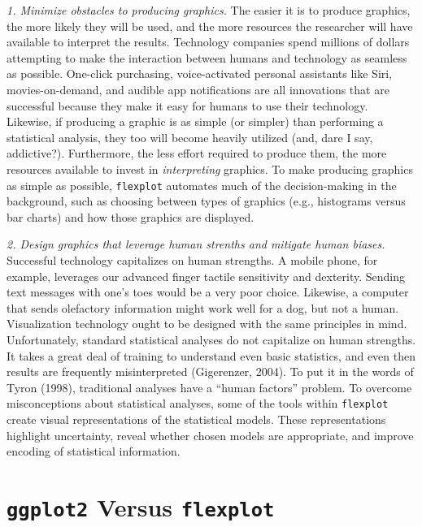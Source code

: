 \documentclass[
  english,
  man]{apa6}
\begin{document}
\emph{1. Minimize obstacles to producing graphics.} The easier it is to produce graphics, the more likely they will be used, and the more resources the researcher will have available to interpret the results. Technology companies spend millions of dollars attempting to make the interaction between humans and technology as seamless as possible. One-click purchasing, voice-activated personal assistants like Siri, movies-on-demand, and audible app notifications are all innovations that are successful because they make it easy for humans to use their technology. Likewise, if producing a graphic is as simple (or simpler) than performing a statistical analysis, they too will become heavily utilized (and, dare I say, addictive?). Furthermore, the less effort required to produce them, the more resources available to invest in \emph{interpreting} graphics. To make producing graphics as simple as possible, \texttt{flexplot} automates much of the decision-making in the background, such as choosing between types of graphics (e.g., histograms versus bar charts) and how those graphics are displayed.

\emph{2. Design graphics that leverage human strenths and mitigate human biases.} Successful technology capitalizes on human strengths. A mobile phone, for example, leverages our advanced finger tactile sensitivity and dexterity. Sending text messages with one's toes would be a very poor choice. Likewise, a computer that sends olefactory information might work well for a dog, but not a human. Visualization technology ought to be designed with the same principles in mind. Unfortunately, standard statistical analyses do not capitalize on human strengths. It takes a great deal of training to understand even basic statistics, and even then results are frequently misinterpreted (Gigerenzer, 2004). To put it in the words of Tyron (1998), traditional analyses have a ``human factors'' problem. To overcome misconceptions about statistical analyses, some of the tools within \texttt{flexplot} create visual representations of the statistical models. These representations highlight uncertainty, reveal whether chosen models are appropriate, and improve encoding of statistical information.

\hypertarget{ggplot2-versus-flexplot}{%
\section{\texorpdfstring{\texttt{ggplot2} Versus \texttt{flexplot}}{ggplot2 Versus flexplot}}\label{ggplot2-versus-flexplot}}
\end{document}
